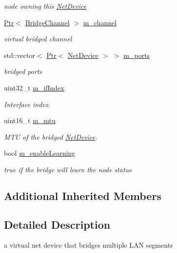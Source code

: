 \begin{DoxyCompactItemize}
\begin{DoxyCompactList}\small\item\em node owning this \hyperlink{classns3_1_1NetDevice}{Net\+Device} \end{DoxyCompactList}\item 
\hyperlink{classns3_1_1Ptr}{Ptr}$<$ \hyperlink{classns3_1_1BridgeChannel}{Bridge\+Channel} $>$ \hyperlink{classns3_1_1BridgeNetDevice_a091384e0ef3d890c26a26d9681b22986}{m\+\_\+channel}
\begin{DoxyCompactList}\small\item\em virtual bridged channel \end{DoxyCompactList}\item 
std\+::vector$<$ \hyperlink{classns3_1_1Ptr}{Ptr}$<$ \hyperlink{classns3_1_1NetDevice}{Net\+Device} $>$ $>$ \hyperlink{classns3_1_1BridgeNetDevice_accf2a9a81b4be28b155d6b5aeeb185be}{m\+\_\+ports}
\begin{DoxyCompactList}\small\item\em bridged ports \end{DoxyCompactList}\item 
uint32\+\_\+t \hyperlink{classns3_1_1BridgeNetDevice_a224b5e6b5a12b9c1dbafec290165eac5}{m\+\_\+if\+Index}
\begin{DoxyCompactList}\small\item\em Interface index. \end{DoxyCompactList}\item 
uint16\+\_\+t \hyperlink{classns3_1_1BridgeNetDevice_ab0ab0e7f99c14058e65f12bfea364641}{m\+\_\+mtu}
\begin{DoxyCompactList}\small\item\em M\+TU of the bridged \hyperlink{classns3_1_1NetDevice}{Net\+Device}. \end{DoxyCompactList}\item 
bool \hyperlink{classns3_1_1BridgeNetDevice_a94b14f30049e8b7fdcd134b620b5996e}{m\+\_\+enable\+Learning}
\begin{DoxyCompactList}\small\item\em true if the bridge will learn the node status \end{DoxyCompactList}\end{DoxyCompactItemize}
\subsection*{Additional Inherited Members}


\subsection{Detailed Description}
a virtual net device that bridges multiple L\+AN segments 

